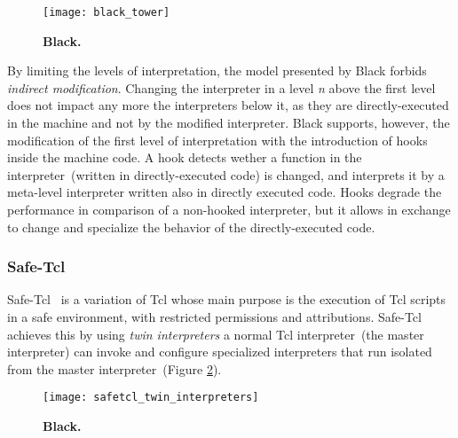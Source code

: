 \begin{figure}[ht]
\begin{center}
\texttt{[image: black\_tower]}
\caption{\textbf{Black.}\label{fig:black_tower}
 }
\end{center}
\end{figure}

By limiting the levels of interpretation, the model presented by Black forbids \emph{indirect modification}. Changing the interpreter in a level \emph{n} above the first level does not impact any more the interpreters below it, as they are directly-executed in the machine and not by the modified interpreter. Black supports, however, the modification of the first level of interpretation with the introduction of hooks inside the machine code. A hook detects wether a function in the interpreter~(written in directly-executed code) is changed, and interprets it by a meta-level interpreter written also in directly executed code. Hooks degrade the performance in comparison of a non-hooked interpreter, but it allows in exchange to change and specialize the behavior of the directly-executed code.

\subsubsection*{Safe-Tcl}
Safe-Tcl~\cite{Levy97a, Bore94a} is a variation of Tcl whose main purpose is the execution of Tcl scripts in a safe environment, with restricted permissions and attributions. Safe-Tcl achieves this by using \emph{twin interpreters} \ie a normal Tcl interpreter~(the master interpreter) can invoke and configure specialized interpreters that run isolated from the master interpreter~(Figure \ref{fig:safetcl_twin_interpreters}).

\begin{figure}[ht]
\begin{center}
\texttt{[image: safetcl\_twin\_interpreters]}
\caption{\textbf{Black.}\label{fig:safetcl_twin_interpreters}
 }
\end{center}
\end{figure}

